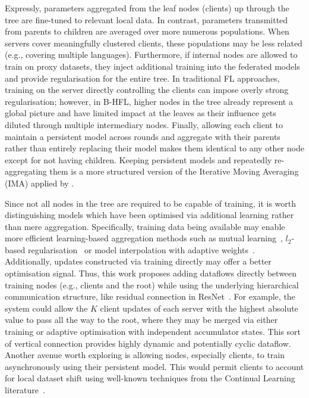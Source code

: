 Expressly, parameters aggregated from the leaf nodes (clients) up through the tree are fine-tuned to relevant local data. In contrast, parameters transmitted from parents to children are averaged over more numerous populations. When servers cover meaningfully clustered clients, these populations may be less related (e.g., covering multiple languages). Furthermore, if internal nodes are allowed to train on proxy datasets, they inject additional training into the federated models and provide regularisation for the entire tree. In traditional FL approaches, training on the server directly controlling the clients can impose overly strong regularisation; however, in B-HFL, higher nodes in the tree already represent a global picture and have limited impact at the leaves as their influence gets diluted through multiple intermediary nodes. Finally, allowing each client to maintain a persistent model across rounds and aggregate with their parents rather than entirely replacing their model makes them identical to any other node except for not having children. Keeping persistent models and repeatedly re-aggregating them is a more structured version of the Iterative Moving Averaging (IMA) applied by \citet{UnderstandingModelAveragingInFL}.

Since not all nodes in the tree are required to be capable of training, it is worth distinguishing models which have been optimised via additional learning rather than mere aggregation. Specifically, training data being available may enable more efficient learning-based aggregation methods such as mutual learning~\citep{DeepMutualLearning}, $l_2$-based regularisation~\citep{Ditto} or model interpolation with adaptive weights~\citep{AdaptivePersonalisedFederatedLearning,ThreeApproachesMansour}. Additionally, updates constructed via training directly may offer a better optimisation signal. Thus, this work proposes adding dataflows directly between training nodes (e.g., clients and the root) while using the underlying hierarchical communication structure, like residual connection in ResNet~\citep{ResNet}. For example, the system could allow the $K$ client updates of each server with the highest absolute value to pass all the way to the root, where they may be merged via either training or adaptive optimisation with independent accumulator states. This sort of vertical connection provides highly dynamic and potentially cyclic dataflow. Another avenue worth exploring is allowing nodes, especially clients, to train asynchronously using their persistent model. This would permit clients to account for local dataset shift using well-known techniques from the Continual Learning literature~\citep{ContinualLearningSurvey,LearningWithoutForgetting,kirkpatrick2017overcoming}.


